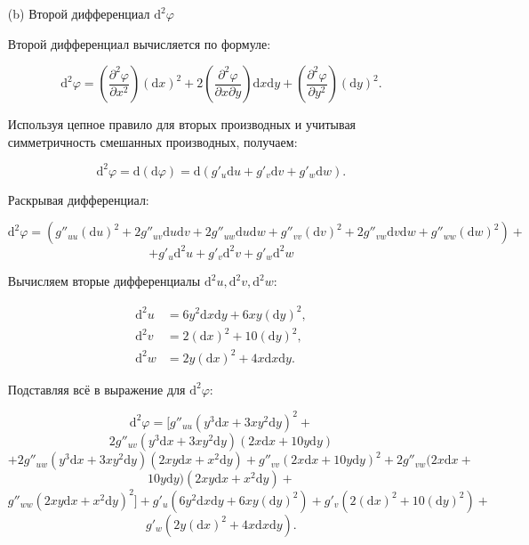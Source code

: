 \documentclass[a4paper]{article}
\begin{document}
\begin{enumerate}
\begin{enumerate}
        \item[(b)]Второй дифференциал \( \mathrm{d}^2\varphi \)

        Второй дифференциал вычисляется по формуле:
        
        \[
        \mathrm{d}^2\varphi = \left( \frac{\partial^2 \varphi}{\partial x^2} \right) (\mathrm{d}x)^2 + 2 \left( \frac{\partial^2 \varphi}{\partial x \partial y} \right) \mathrm{d}x \mathrm{d}y + \left( \frac{\partial^2 \varphi}{\partial y^2} \right) (\mathrm{d}y)^2.
        \]
        
        Используя цепное правило для вторых производных и учитывая симметричность смешанных производных, получаем:
        
        \[
        \mathrm{d}^2\varphi = \mathrm{d}(\mathrm{d}\varphi) = \mathrm{d}\left( g'_u \mathrm{d}u + g'_v \mathrm{d}v + g'_w \mathrm{d}w \right).
        \]
        
        Раскрывая дифференциал:
        
        \[
        \mathrm{d}^2\varphi = \left( g''_{uu} (\mathrm{d}u)^2 + 2g''_{uv} \mathrm{d}u \mathrm{d}v + 2g''_{uw} \mathrm{d}u \mathrm{d}w + g''_{vv} (\mathrm{d}v)^2 + 2g''_{vw} \mathrm{d}v \mathrm{d}w + g''_{ww} (\mathrm{d}w)^2 \right)+\]
        \[ + g'_u \mathrm{d}^2u + g'_v \mathrm{d}^2v + g'_w \mathrm{d}^2w 
        \]
        
        Вычисляем вторые дифференциалы \( \mathrm{d}^2u, \mathrm{d}^2v, \mathrm{d}^2w \):
        
        \[
        \begin{aligned}
        \mathrm{d}^2u &= 6y^2 \mathrm{d}x \mathrm{d}y + 6xy (\mathrm{d}y)^2, \\
        \mathrm{d}^2v &= 2 (\mathrm{d}x)^2 + 10 (\mathrm{d}y)^2, \\
        \mathrm{d}^2w &= 2y (\mathrm{d}x)^2 + 4x \mathrm{d}x \mathrm{d}y.
        \end{aligned}
        \]
        
        Подставляя всё в выражение для \( \mathrm{d}^2\varphi \):
        
        \[
        \mathrm{d}^2\varphi = \Big[ g''_{uu} (y^3 \mathrm{d}x + 3xy^2 \mathrm{d}y)^2 + \]
        \[2g''_{uv} (y^3 \mathrm{d}x + 3xy^2 \mathrm{d}y)(2x \mathrm{d}x + 10y \mathrm{d}y) \]
        \[+ 2g''_{uw} (y^3 \mathrm{d}x + 3xy^2 \mathrm{d}y)(2xy \mathrm{d}x + x^2 \mathrm{d}y) 
        + g''_{vv} (2x \mathrm{d}x + 10y \mathrm{d}y)^2 + 2g''_{vw} (2x \mathrm{d}x + \]\[10y \mathrm{d}y)(2xy \mathrm{d}x + x^2 \mathrm{d}y) + \]
        \[g''_{ww} (2xy \mathrm{d}x + x^2 \mathrm{d}y)^2 \Big] + g'_u (6y^2 \mathrm{d}x \mathrm{d}y + 6xy (\mathrm{d}y)^2) + g'_v (2 (\mathrm{d}x)^2 + 10 (\mathrm{d}y)^2) +\]\[ g'_w (2y (\mathrm{d}x)^2 + 4x \mathrm{d}x \mathrm{d}y).
        \]
        

\end{enumerate}
\end{enumerate}
\end{document}
